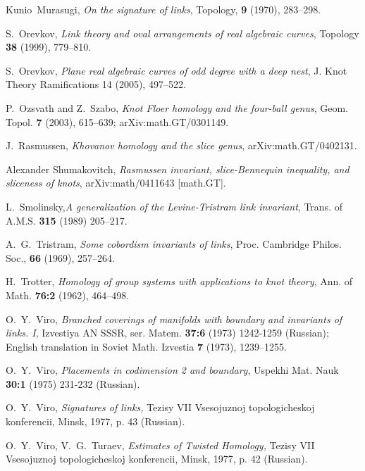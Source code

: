\documentclass{article}
\numberwithin{equation}{section}
\begin{document}
\begin{thebibliography}{99}
  Kunio~Murasugi, {\sl On the signature of links}, 
Topology, {\bf 9} (1970), 283--298.

 S.~Orevkov, {\sl Link theory and oval
  arrangements of real algebraic curves}, Topology {\bf38} (1999),
  779--810.

  S.~Orevkov, {\sl Plane real algebraic curves of 
odd degree with a deep nest}, J. Knot Theory Ramifications  14 (2005), 
497--522. 

 P.~Ozsvath and Z.~Szabo, {\sl Knot Floer homology and 
the four-ball genus}, Geom. Topol. {\bf 7}
(2003), 615--639; arXiv:math.GT/0301149.

  J.~Rasmussen, {\sl Khovanov homology and the slice
  genus}, arXiv:math.GT/0402131.

 Alexander Shumakovitch, {\sl Rasmussen invariant,
slice-Bennequin inequality, and sliceness of knots},
arXiv:math/0411643 [math.GT].     

 L.~Smolinsky,{\sl A generalization of the 
Levine-Tristram link invariant}, Trans. of A.M.S. {\bf 315} (1989) 205--217.

  A.~G.~Tristram, {\sl Some cobordism invariants of
  links}, Proc. Cambridge Philos. Soc., {\bf 66} (1969), 257--264.  

 H.~Trotter, {\sl Homology of group systems with 
applications to knot theory}, Ann. of Math. {\bf 76:2}
  (1962),  464--498.


 O.~Y.~Viro, {\sl Branched coverings of manifolds with boundary and invariants of links. I}, Izvestiya AN SSSR, ser. Matem. {\bf 37:6} 
(1973) 1242-1259
(Russian); English translation in Soviet Math. Izvestia {\bf 7} (1973),
1239--1255.

 O.~Y.~Viro, {\sl  Placements in codimension 2 and boundary},  Uspekhi Mat. Nauk {\bf 30:1} (1975) 231-232 (Russian).

 O.~Y.~Viro,  {\sl Signatures of links,\/}
Tezisy VII Vsesojuznoj topologicheskoj konferencii, Minsk,
1977, p. 43 (Russian).

 O.~Y.~Viro, V.~G.~Turaev, {\sl Estimates of Twisted
Homology,\/} Tezisy VII Vsesojuznoj topologicheskoj konferencii, Minsk,
1977, p. 42 (Russian).


\end{thebibliography} 
\end{document}
